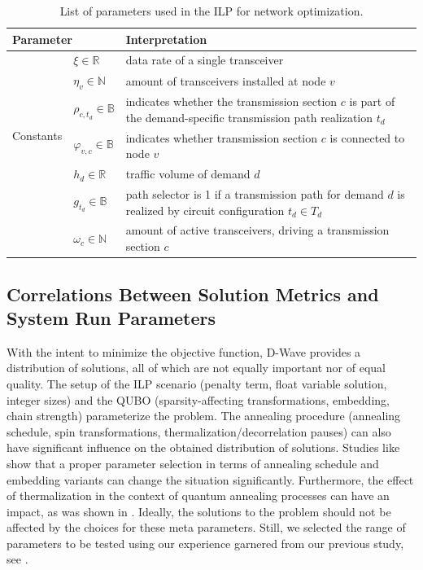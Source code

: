 \documentclass[utf8, nocrop]{FrontiersinHarvardArxiv}
\def\N{\mathbb{N}}
\def\R{\mathbb{R}}
\def\B{\mathbb{B}}
\begin{document}
\begin{table}[t]
	\centering
	\caption{List of parameters used in the ILP for network optimization.}
	\label{tab:ilp_param}
	\begin{tabular}{llp{11.5cm}}
		\toprule
		\multicolumn{2}{l}{Parameter}&Interpretation\\
		\midrule
		\multirow{6}{*}{Constants}&$\xi \in \R$& data rate of a single transceiver\\
		&$\eta_v \in \N$ & amount of transceivers installed at node $v$\\
		&$\rho_{c,t_d} \in \B$& indicates whether the transmission section $c$ is part of the demand-specific transmission path realization $t_d$\\
		&$\varphi_{v,c} \in \B$& indicates whether transmission section $c$ is connected to node $v$\\
		&$h_d\in \mathbb{R}$& traffic volume of demand $d$\\
		\midrule
		\multirow{3}{*}{Variables}&$g_{t_d}\in\B$&path selector is 1 if a transmission path for demand $d$ is realized by circuit configuration $t_d\in T_d$\\
		&$\omega_c\in\N$&amount of active transceivers, driving a transmission section $c$\\
		\bottomrule
	\end{tabular} 
\end{table}

\subsection{Correlations Between Solution Metrics and System Run Parameters}
\label{sec:solution_quality}

With the intent to minimize the objective function, D-Wave provides a distribution of solutions, all of which are not equally important nor of equal quality.
The setup of the ILP scenario (penalty term, float variable solution, integer sizes) and the QUBO (sparsity-affecting transformations, embedding, chain strength) parameterize the problem.
The annealing procedure (annealing schedule, spin transformations, thermalization/decorrelation pauses) can also have significant influence on the obtained distribution of solutions. Studies like \cite{Willsch_2022} show that a proper parameter selection in terms of annealing schedule and embedding variants can change the situation significantly. 
Furthermore, the effect of thermalization in the context of quantum annealing processes can have an impact, as was shown in \cite{term_annealing_2013}.
Ideally, the solutions to the problem should not be affected by the choices for these meta parameters. 
Still, we selected the range of parameters to be tested using our experience garnered from our previous study, see \cite{Witt:2022lsx}.
\end{document}
